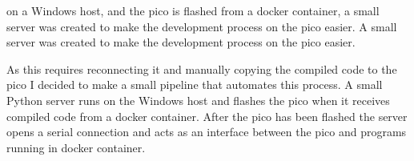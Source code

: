 on a Windows host, and the \gls{pico} is flashed from a docker container, a small \py server was created to make the development process on the \gls{pico} easier.
A small \py server was created to make the development process on the \gls{pico} easier.

As this requires reconnecting it and manually copying the compiled code to the \gls{pico} I decided to make a small pipeline that automates this process.
A small Python server runs on the Windows host and flashes the \gls{pico} when it receives compiled code from a docker container.
After the \gls{pico} has been flashed the server opens a serial connection and acts as an interface between the \gls{pico} and programs running in docker container.




